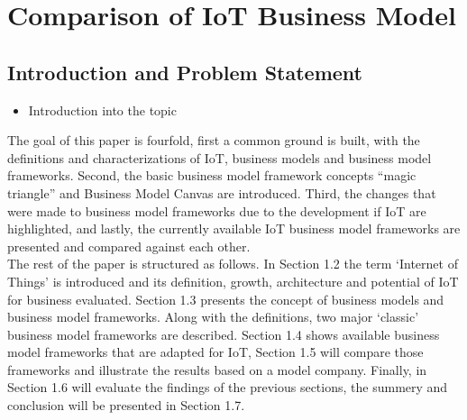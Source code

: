 
\chapter{Comparison of IoT Business Model}


\newpage

\minitoc %

\newpage
\renewcommand{\labelitemii}{$\diamond$}
\renewcommand{\labelitemiii}{$\circ$}
\section{Introduction and Problem Statement}
	\begin{itemize}
		\item Introduction into the topic
	\end{itemize}

The goal of this paper is fourfold, first a common ground is built, with the definitions and characterizations of IoT, business models and business model frameworks. Second, the basic business model framework concepts ``magic triangle'' and  Business Model Canvas are introduced. Third, the changes that were made to business model frameworks due to the development if IoT are highlighted, and lastly, the currently available IoT business model frameworks are presented and compared against each other.\\
The rest of the paper is structured as follows. In Section 1.2 the term `Internet of Things' is introduced and its definition, growth, architecture and potential of IoT for business evaluated. Section 1.3 presents the concept of business models and business model frameworks. Along with the definitions, two major `classic' business model frameworks are described. Section 1.4 shows available business model frameworks that are adapted for IoT, Section 1.5 will compare those frameworks and illustrate the results based on a model company. Finally, in Section 1.6 will evaluate the findings of the previous sections, the summery and conclusion will be presented in Section 1.7. 
 
